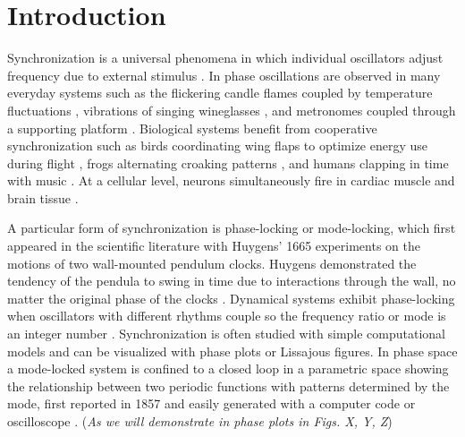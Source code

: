 \documentclass[twocolumn,preprintnumbers,amsmath,amssymb,aps,prx]{revtex4}
\begin{document}
\maketitle %

\section{Introduction} %
%
Synchronization is a universal phenomena
in which individual oscillators adjust frequency due
to external stimulus \cite{Pikovsky2003}.
In phase oscillations
are observed
in many everyday systems
such as the
flickering candle flames coupled by temperature fluctuations \cite{Okamoto2016},
vibrations of singing wineglasses \cite{Arane2009}, 
and metronomes coupled through a supporting platform \cite{Jia2015}.
Biological systems benefit from cooperative
synchronization such as 
birds coordinating wing flaps
to optimize energy use during flight \cite{Portugal2014},
frogs alternating croaking patterns \cite{Aihara2014},
and humans clapping in time with music \cite{Tranchant2016}.
At a cellular level, 
neurons simultaneously fire in cardiac muscle \cite{MartinHall1999}
and brain tissue \cite{Singer1999}.

A particular form of 
synchronization is phase-locking or mode-locking,
which first appeared in the scientific literature
with 
Huygens' 1665 experiments on
the 
motions of two wall-mounted pendulum clocks.
Huygens demonstrated the tendency of
the pendula 
to swing in time %
due to interactions through the wall,  
no matter the original phase of the clocks \cite{Bennett2002}.
Dynamical systems %
exhibit phase-locking 
when oscillators with different rhythms couple
so the frequency ratio or mode 
is an integer number \cite{Bak1986}.
Synchronization 
is often studied with simple computational models
and can be visualized 
with phase plots or Lissajous figures.
In phase space 
a mode-locked system is confined to 
a closed loop in a 
parametric space showing the relationship between two periodic functions
with patterns determined by the mode, %
first reported in 1857 \cite{Lissajous1857}
and easily generated with a computer code 
or oscilloscope \cite{Tong1997}. 
({\it As we will demonstrate in phase plots in Figs. X, Y, Z})
\end{document}
